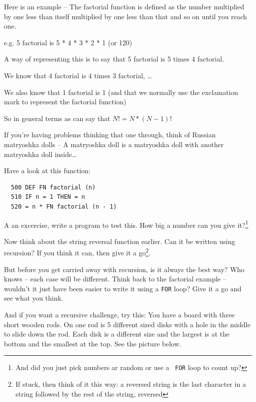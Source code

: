 Here is an example -- The factorial function
is defined as the number multiplied by one less than itself multiplied
by one less than that and so on until you reach one.

e.g. 5 factorial is 5 * 4 * 3 * 2 * 1 (or 120)

A way of representing this is to say that 5 factorial
is 5 times 4 factorial.

We know that 4 factorial is 4 times 3 factorial, \dots

We also know that 1 factorial is 1 (and that we normally use the
exclamation mark to represent the factorial function)

So in general terms as can say that $N! = N * (N - 1)!$

If you're having problems thinking that one through, think of Russian
matryoshka dolls -- A matryoshka doll is a
matryoshka doll with another matryoshka doll inside\dots

\noindent
Have a look at this function:
\begin{verbatim}
  500 DEF FN factorial (n)
  510 IF n = 1 THEN = n
  520 = n * FN factorial (n - 1)
\end{verbatim}

A an excercise, write a program to test this. How big a number can you
give it?\footnote{And did you just pick numbers ar random or use a {\tt
FOR} loop to count up?}

Now think about the string reversal function earlier. Can it be written
using recursion? If you think it can, then give it a go\footnote{If
stuck, then think of it this way: a reversed string is the
last character in a string followed by the rest of the string, reversed}.

But \meek before you get carried away with recursion, is it always the
best way? Who knows -- each case will be different. Think back to the
factorial example -- wouldn't it just have been easier to write it using
a {\tt FOR} loop? Give it a go and see what you think.

And if you want a recursive challenge, try this: You have a board with
three short wooden rods. On one rod is 5 different sized disks with a
hole in the middle to slide down the rod. Each disk is a different size
and the largest is at the bottom and the smallest at the top. See the
picture below.

